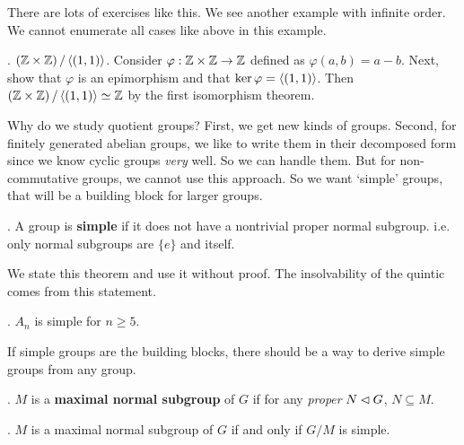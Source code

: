 There are lots of exercises like this. We see another example with infinite order. We cannot enumerate all cases like above in this example.

\pagebreak

\ex. \((\mathbb{Z} \times \mathbb{Z}) \operatorname{/} \left\langle (1, 1) \right\rangle\). Consider \(\varphi : \mathbb{Z} \times \mathbb{Z} \rightarrow \mathbb{Z}\) defined as \(\varphi(a, b) = a - b\). Next, show that \(\varphi\) is an epimorphism and that \(\ker\varphi = \left\langle (1, 1) \right\rangle\). Then \((\mathbb{Z} \times \mathbb{Z}) \operatorname{/} \left\langle (1, 1) \right\rangle \simeq \mathbb{Z}\) by the first isomorphism theorem.

Why do we study quotient groups? First, we get new kinds of groups. Second, for finitely generated abelian groups, we like to write them in their decomposed form since we know cyclic groups \textit{very} well. So we can handle them. But for non-commutative groups, we cannot use this approach. So we want `simple' groups, that will be a building block for larger groups.

.  A group is \textbf{simple} if it does not have a nontrivial proper normal subgroup. i.e. only normal subgroups are \(\{e\}\) and itself.

We state this theorem and use it without proof. The insolvability of the quintic comes from this statement.

\thm. \(A_n\) is simple for \(n \geq 5\).

If simple groups are the building blocks, there should be a way to derive simple groups from any group.

.  \(M\) is a \textbf{maximal normal subgroup} of \(G\) if for any \textit{proper} \(N \lhd G\), \(N \subseteq M\).

\thm. \(M\) is a maximal normal subgroup of \(G\) if and only if \(G/M\) is simple.

\smallskip
